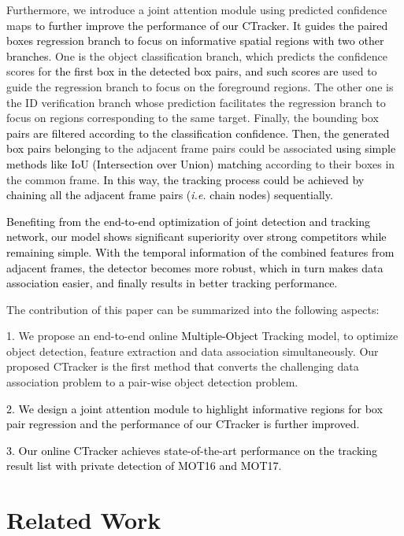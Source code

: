\documentclass[../arXiv_main.tex]{subfiles}
\newcommand\pjl[1]{\textcolor{black}{#1}}
\newcommand\wca[1]{\textcolor{black}{#1}}
\newcommand\wfb[1]{\textcolor{black}{#1}}
\newcommand{\yang}[1]{\textcolor{black}{#1}}
\newcommand\CRwfb[1]{\textcolor{black}{#1}}
\newcommand{\CRyang}[1]{\textcolor{black}{#1}}
\begin{document}
Furthermore, we introduce a joint attention module using predicted confidence maps \CRwfb{to further improve the performance of our CTracker.  It guides the paired boxes regression branch to focus on informative spatial regions with two other branches}. One is the object classification branch, which predicts the confidence scores for \yang{the first box in the detected box pairs, and such scores are} used to guide the regression branch to focus on the foreground regions. The other one is the ID verification branch whose prediction facilitates the regression branch to focus on regions corresponding to the same target. Finally, the bounding box \wca{pairs are filtered according to the classification confidence. Then, the generated box pairs} \yang{belonging} to the adjacent frame pairs could be associated \yang{using} \CRyang{simple methods like} \wca{IoU (Intersection over Union) \yang{matching}} \cite{bochinski2017high} according to their boxes in the common frame. \pjl{In this way, the tracking process could be achieved by chaining all the adjacent frame pairs \CRyang{(\emph{i.e.} chain nodes) sequentially.}}

\pjl{\CRyang{Benefiting} from the end-to-end optimization of joint detection and tracking network, our model shows significant \CRyang{superiority} over strong competitors while \yang{remaining} simple.} 
\wca{With the temporal information of the combined \yang{features} from adjacent frames, the detector \yang{becomes} more robust, which in turn makes data association easier, and \pjl{finally} results in better tracking performance.}


The contribution of this paper can be summarized into the following aspects:

1. We propose an end-to-end online \yang{Multiple-Object} Tracking model, to optimize object detection, feature extraction and data association simultaneously. Our proposed CTracker is the first method \wfb{that} converts the challenging data association problem to \CRwfb{a} pair-wise object detection problem.

\wca{2. We design a joint attention module to highlight informative regions for box pair regression and the performance of our \yang{CTracker} is further improved.}

\wfb{3. Our online CTracker achieves state-of-the-art performance on the tracking result list with private detection of MOT16 and MOT17.}



\section{Related Work}
\end{document}
